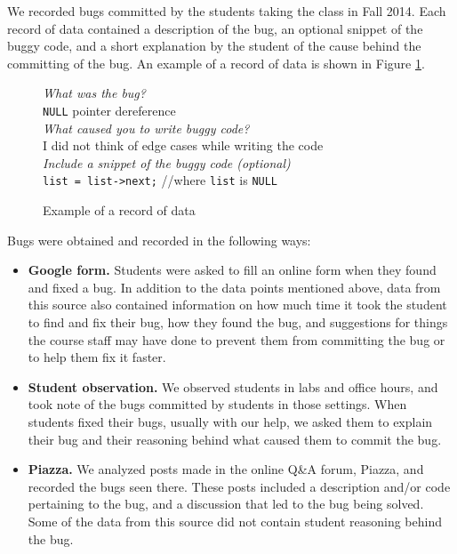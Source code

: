 \documentclass{sig-alternate}
\begin{document}
We recorded bugs committed by the students taking the class in Fall
2014. Each record of data contained a description of the bug, an
optional snippet of the buggy code, and a short explanation by the
student of the cause behind the committing of the bug. An example of a
record of data is shown in Figure \ref{fig:record}.\\

\begin{figure}
\begin{framed}
\emph{What was the bug?}\\
\verb|NULL| pointer dereference\\

\emph{What caused you to write buggy code?}\\
 I did not think of edge cases while writing the code\\

\emph{Include a snippet of the buggy code (optional)}\\
\verb|list = list->next;| //where \verb|list| is \verb|NULL|
\end{framed}
\vspace{-0.1in}
\caption{Example of a record of data}
\label{fig:record}
\end{figure}

Bugs were obtained and recorded in the following ways:
\begin{itemize}

\item{\textbf{Google form.} Students were asked to fill an online form
when they found and fixed a bug. In addition to the data points
mentioned above, data from this source also contained information on
how much time it took the student to find and fix their bug, how they
found the bug, and suggestions for things the course staff may have
done to prevent them from committing the bug or to help them fix it
faster.}

\item{\textbf{Student observation.} We observed students in labs and
office hours, and took note of the bugs committed by students in those
settings. When students fixed their bugs, usually with our help, we
asked them to explain their bug and their reasoning behind what caused
them to commit the bug.}

\item{\textbf{Piazza.} We analyzed posts made in the online Q\&A
forum, Piazza, and recorded the bugs seen there. These posts included
a description and/or code pertaining to the bug, and a discussion that
led to the bug being solved. Some of the data from this source did not
contain student reasoning behind the bug.}

\end{itemize}
\end{document}
